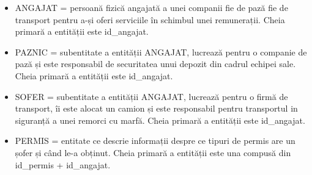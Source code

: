 \documentclass[12pt, a4paper]{article}
\begin{document}
\begin{itemize}
    \item ANGAJAT = persoană fizică angajată a unei companii fie de pază fie de transport pentru a-și oferi serviciile în schimbul unei remunerații. Cheia primară a entității este id\_angajat.
    \item PAZNIC = subentitate a entității ANGAJAT, lucrează pentru o companie de pază și este responsabil de securitatea unui depozit din cadrul echipei sale. Cheia primară a entității este id\_angajat.
    \item SOFER = subentitate a entității ANGAJAT, lucrează pentru o firmă de transport, îi este alocat un camion și este responsabil pentru transportul in siguranță a unei remorci cu marfă. Cheia primară a entității este id\_angajat.
    \item PERMIS = entitate ce descrie informații despre ce tipuri de permis are un șofer și când le-a obținut. Cheia primară a entității este una compusă din id\_permis + id\_angajat.
\end{itemize}

\newpage
\end{document}
